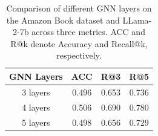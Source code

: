 \begin{table}[t]
  \centering
  \caption{ 
   Comparison of different GNN layers on the Amazon Book dataset and LLama-2-7b across three metrics. ACC and R@k denote Accuracy and Recall@k, respectively.}
    \scalebox{0.75}
{
    \begin{tabular}{c|c|c|c}
    \toprule
    \toprule
    \multirow{1}{*}{GNN Layers}  & \multirow{1}{*}{ACC} & \multirow{1}{*}{R@3} &\multirow{1}{*}{R@5}  \\
    \midrule
    3 layers&  0.496 & 0.653 & 0.736 \\
    4 layers& 0.506 & 0.690 & 0.780 \\
    5 layers& 0.498 &0.656 &0.729 \\
    \bottomrule
    \bottomrule
    \end{tabular}%
}
  \label{tab:gnn_layer}%
\end{table}%